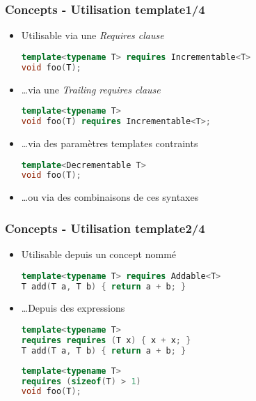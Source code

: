 \documentclass[C++.tex]{subfiles}
\begin{document}
\begin{frame}[fragile]
	\frametitle{Concepts - Utilisation template\titlehfill{}1/4}
	\begin{itemize}
		\item Utilisable via une \textit{Requires clause}

		\begin{lstlisting}[language=C++]
template<typename T> requires Incrementable<T>
void foo(T);\end{lstlisting}

		\item \ldots via une \textit{Trailing requires clause}

		\begin{lstlisting}[language=C++]
template<typename T>
void foo(T) requires Incrementable<T>;\end{lstlisting}
		
		
		\item \ldots via des paramètres templates contraints

		\begin{lstlisting}[language=C++]
template<Decrementable T>
void foo(T);\end{lstlisting}

		\item \ldots ou via des combinaisons de ces syntaxes
	\end{itemize}
\end{frame}

\begin{frame}[fragile]
	\frametitle{Concepts - Utilisation template\titlehfill{}2/4}
	\begin{itemize}
		\item Utilisable depuis un concept nommé

		\begin{lstlisting}[language=C++]
template<typename T> requires Addable<T>
T add(T a, T b) { return a + b; }\end{lstlisting}

		\item \ldots Depuis des expressions
 
		\begin{lstlisting}[language=C++]
template<typename T>
requires requires (T x) { x + x; }
T add(T a, T b) { return a + b; }\end{lstlisting}

		\begin{lstlisting}[language=C++]
template<typename T>
requires (sizeof(T) > 1)
void foo(T);\end{lstlisting}

	\end{itemize}
\end{frame}
\end{document}
